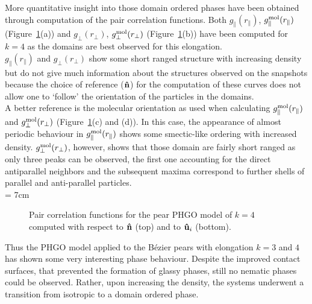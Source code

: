 More quantitative insight into those domain ordered phases have been obtained through
computation of the pair correlation functions. Both $g_\parallel(r_\parallel)$,
$g^{\mathrm{mol}}_\parallel(r_\parallel)$ (Figure~\ref{fig:gr_PHGO_k4}(a)) and $g_\perp(r_\perp)$,
$g^{\mathrm{mol}}_\perp(r_\perp)$ (Figure~\ref{fig:gr_PHGO_k4}(b)) have been computed  for $k=4$ as
the domains are best observed for this elongation.\\
%
$g_\parallel(r_\parallel)$ and $g_\perp(r_\perp)$ show some short ranged structure with 
increasing density but do not give much information about the structures observed 
on the snapshots because the choice of reference ($\mathbf{\hat{n} }$) for the computation of these 
curves does not allow one to `follow' the orientation of the particles in the domains.\\
A better reference is the molecular orientation as used when calculating 
$g^{\mathrm{mol}}_\parallel(r_\parallel)$
and $g^{\mathrm{mol}}_\perp(r_\perp)$ (Figure~\ref{fig:gr_PHGO_k4}(c) and (d)).
In this case, the appearance of almost periodic  behaviour in $g^{\mathrm{mol}}_\parallel(r_\parallel)$ 
shows some smectic-like ordering with increased density. $g^{\mathrm{mol}}_\perp(r_\perp)$, however,
shows that those domain are fairly short ranged as only three peaks can be observed, the first one 
accounting for the direct antiparallel neighbors and the subsequent maxima correspond to further
shells of parallel and anti-parallel particles.\\


\picW = 7cm
\begin{figure}
	\centering

	\caption{Pair correlation functions for the pear PHGO model of $k=4$ computed with respect to 
	$\mathbf{\hat{n} }$ (top) and to $\mathbf{\hat{u} }_i$ (bottom).}
	\label{fig:gr_PHGO_k4}
\end{figure}

Thus the PHGO model applied to the B\'ezier pears with elongation $k=3$ and $4$ has shown some very 
interesting phase behaviour. Despite the improved contact surfaces, that prevented the formation 
of glassy phases, still no nematic phases could be observed. Rather, upon increasing the
density, the systems underwent a transition from isotropic to a domain ordered phase.

